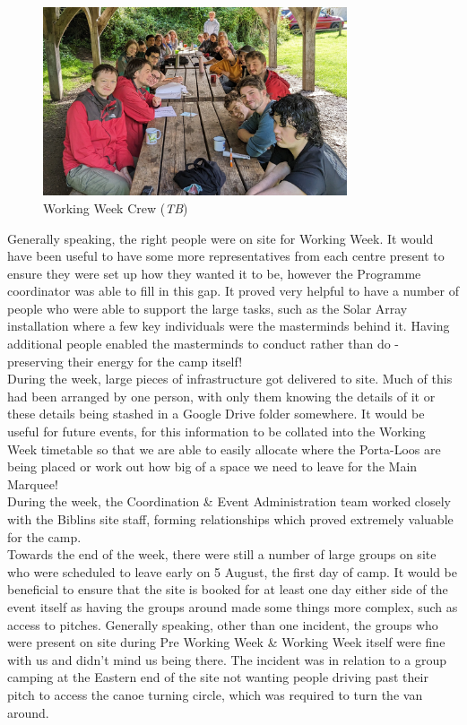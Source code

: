 \begin{figure}[ht]
    \centering
    \includegraphics[width=0.8\textwidth]{assets/working-week-breifing.jpg}
    \caption{Working Week Crew (\textit{TB})}
\end{figure}

Generally speaking, the right people were on site for Working Week. It would have been useful to have some more representatives from each centre present to ensure they were set up how they wanted it to be, however the Programme coordinator was able to fill in this gap. It proved very helpful to have a number of people who were able to support the large tasks, such as the Solar Array installation where a few key individuals were the masterminds behind it. Having additional people enabled the masterminds to conduct rather than do - preserving their energy for the camp itself!\\

During the week, large pieces of infrastructure got delivered to site. Much of this had been arranged by one person, with only them knowing the details of it or these details being stashed in a Google Drive folder somewhere. It would be useful for future events, for this information to be collated into the Working Week timetable so that we are able to easily allocate where the Porta-Loos are being placed or work out how big of a space we need to leave for the Main Marquee!\\

During the week, the Coordination \& Event Administration team worked closely with the Biblins site staff, forming relationships which proved extremely valuable for the camp.\\

Towards the end of the week, there were still a number of large groups on site who were scheduled to leave early on 5 August, the first day of camp. It would be beneficial to ensure that the site is booked for at least one day either side of the event itself as having the groups around made some things more complex, such as access to pitches. Generally speaking, other than one incident, the groups who were present on site during Pre Working Week \& Working Week itself were fine with us and didn't mind us being there. The incident was in relation to a group camping at the Eastern end of the site not wanting people driving past their pitch to access the canoe turning circle, which was required to turn the van around. 
